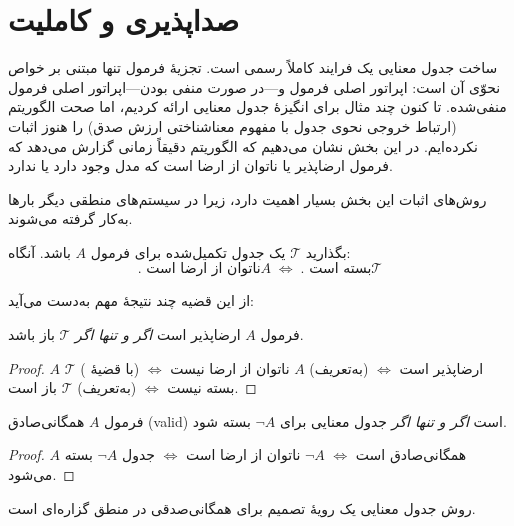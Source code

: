 \section*{ صداپذیری و کاملیت }

    ساخت جدول معنایی یک فرایند کاملاً رسمی است. تجزیهٔ فرمول تنها مبتنی بر خواص نحوّی آن است: اپراتور اصلی فرمول و—در صورت منفی بودن—اپراتور اصلی فرمول منفی‌شده. تا کنون چند مثال برای انگیزهٔ جدول معنایی ارائه کردیم، اما صحت الگوریتم (ارتباط خروجی نحوی جدول با مفهوم معناشناختی ارزش صدق) را هنوز اثبات نکرده‌ایم. در این بخش نشان می‌دهیم که الگوریتم دقیقاً زمانی گزارش می‌دهد که فرمول ارضاپذیر یا ناتوان از ارضا است که مدل وجود دارد یا ندارد.
    
    روش‌های اثبات این بخش بسیار اهمیت دارد، زیرا در سیستم‌های منطقی دیگر بارها به‌کار گرفته می‌شوند.
    
    \begin{theorem}
      بگذارید $\mathscr{T}$ یک جدول تکمیل‌شده برای فرمول $A$ باشد. آنگاه:
      \[
      .\text{ ناتوان از ارضا است} A
      \;\Longleftrightarrow\;
      .\text{ بسته است} \mathscr{T}
      \]
    \end{theorem}
    
    از این قضیه چند نتیجهٔ مهم به‌دست می‌آید:
    
    \begin{corollary}
      فرمول $A$ ارضاپذیر است \emph{اگر و تنها اگر} $\mathscr{T}$ باز باشد.
    \end{corollary}
    
    \begin{proof}
      $A$ ارضاپذیر است $\iff$ (به‌تعریف) $A$ ناتوان از ارضا نیست  
      $\iff$ (با قضیهٔ ) $\mathscr{T}$ بسته نیست  
      $\iff$ (به‌تعریف) $\mathscr{T}$ باز است.
    \end{proof}
    
    \begin{corollary}
      فرمول $A$ همگانی‌صادق (valid) است \emph{اگر و تنها اگر} جدول معنایی برای $\neg A$ بسته شود.
    \end{corollary}
    
    \begin{proof}
      $A$ همگانی‌صادق است  
      $\iff$ $\neg A$ ناتوان از ارضا است  
      $\iff$ جدول $\neg A$ بسته می‌شود.
    \end{proof}
    
    \begin{corollary}
      روش جدول معنایی یک رویهٔ تصمیم  برای همگانی‌صدقی در منطق گزاره‌ای است.
    \end{corollary}
    
